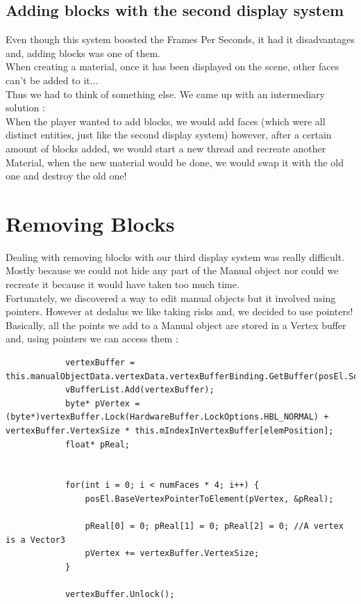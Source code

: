 \documentclass[article]{report}         %
\begin{document}
        \subsection{Adding blocks with the second display system}
          Even though this system boosted the Frames Per Seconds, it had it disadvantages and, adding blocks was one of them.\\
          When creating a material, once it has been displayed on the scene, other faces can't be added to it...\\ 
          Thus we had to think of something else. We came up with an intermediary solution : \\
          When the player wanted to add blocks, we would add faces (which were all distinct entities, just like the second display system) however, after a certain amount of blocks added, we would start a new thread and recreate another Material, when the new material would be done, we would swap it with the old one and destroy the old one!

      \section{Removing Blocks}
        Dealing with removing blocks with our third display system was really difficult. Mostly because we could not hide any part of the Manual object nor could we recreate it because it would have taken too much time.\\

        Fortunately, we discovered a way to edit manual objects but it involved using pointers. However at dedalus we like taking risks and, we decided to use pointers!\\
        Basically, all the points we add to a Manual object are stored in a Vertex buffer and, using pointers we can access them :

        \begin{lstlisting}
            vertexBuffer = this.manualObjectData.vertexData.vertexBufferBinding.GetBuffer(posEl.Source);
            vBufferList.Add(vertexBuffer);
            byte* pVertex = (byte*)vertexBuffer.Lock(HardwareBuffer.LockOptions.HBL_NORMAL) + vertexBuffer.VertexSize * this.mIndexInVertexBuffer[elemPosition];
            float* pReal;


            for(int i = 0; i < numFaces * 4; i++) {
                posEl.BaseVertexPointerToElement(pVertex, &pReal);

                pReal[0] = 0; pReal[1] = 0; pReal[2] = 0; //A vertex is a Vector3
                pVertex += vertexBuffer.VertexSize;
            }

            vertexBuffer.Unlock();
            \end{lstlisting}
\end{document}
